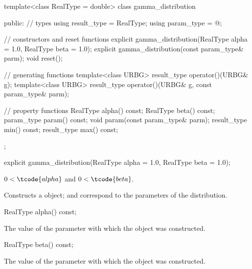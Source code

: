 %
\begin{codeblock}
template<class RealType = double>
 class gamma_distribution
{
public:
 // types
 using result_type = RealType;
 using param_type  = @\unspec@;

 // constructors and reset functions
 explicit gamma_distribution(RealType alpha = 1.0, RealType beta = 1.0);
 explicit gamma_distribution(const param_type& parm);
 void reset();

 // generating functions
 template<class URBG>
   result_type operator()(URBG& g);
 template<class URBG>
   result_type operator()(URBG& g, const param_type& parm);

 // property functions
 RealType alpha() const;
 RealType beta() const;
 param_type param() const;
 void param(const param_type& parm);
 result_type min() const;
 result_type max() const;
};
\end{codeblock}


%
\begin{itemdecl}
explicit gamma_distribution(RealType alpha = 1.0, RealType beta = 1.0);
\end{itemdecl}

\begin{itemdescr}
\pnum\requires
 $ 0 < \tcode{alpha} $
 and $ 0 < \tcode{beta} $.

\pnum\effects Constructs a  object;
  and 
 correspond to the parameters of the distribution.
\end{itemdescr}

%
\begin{itemdecl}
RealType alpha() const;
\end{itemdecl}

\begin{itemdescr}
\pnum\returns The value of the  parameter
 with which the object was constructed.
\end{itemdescr}

%
\begin{itemdecl}
RealType beta() const;
\end{itemdecl}

\begin{itemdescr}
\pnum\returns The value of the  parameter
 with which the object was constructed.
\end{itemdescr}

